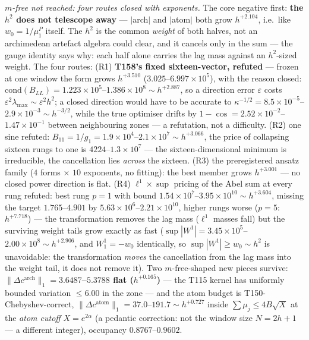 \documentclass[11pt,a4paper]{article}
\begin{document}
\emph{$m$-free not reached: four routes closed with exponents.} The core negative
first: \textbf{the $h^2$ does not telescope away} --- $|$arch$|$ and $|$atom$|$
both grow $h^{+2.104}$, i.e.\ like $w_0=1/\mu^P_1$ itself. The $h^2$ is the common
\emph{weight} of both halves, not an archimedean artefact algebra could clear, and
it cancels only in the sum --- the gauge identity says why: each half alone
carries the lag mass against an $h^2$-sized weight. The four routes: (R1)
\textbf{T158's fixed sixteen-vector, refuted} --- frozen at one window the form
grows $h^{+3.510}$ ($3.025$--$6.997\times10^{5}$), with the reason closed:
$\mathrm{cond}(B_{LL})=1.223\times10^{5}$--$1.386\times10^{8}\sim h^{+2.887}$, so
a direction error $\varepsilon$ costs $\varepsilon^2\lambda_{\max}\sim
\varepsilon^2h^2$; a closed direction would have to be accurate to
$\kappa^{-1/2}=8.5\times10^{-5}$--$2.9\times10^{-3}\sim h^{-3/2}$, while the true
optimiser drifts by $1-\cos=2.52\times10^{-2}$--$1.47\times10^{-1}$ between
neighbouring zones --- a refutation, not a difficulty. (R2) one sine refuted:
$B_{11}=1/g_1=1.9\times10^{4}$--$2.1\times10^{7}\sim h^{+3.066}$, the price of
collapsing sixteen rungs to one is $4224$--$1.3\times10^{7}$ --- the
sixteen-dimensional minimum is irreducible, the cancellation lies \emph{across}
the sixteen. (R3) the preregistered ansatz family ($4$ forms $\times$ $10$
exponents, no fitting): the best member grows $h^{+3.001}$ --- no closed power
direction is flat. (R4) $\ell^1\times\sup$ pricing of the Abel sum at every rung
refuted: best rung $p=1$ with bound $1.54\times10^{7}$--$3.95\times10^{10}\sim
h^{+3.604}$, missing the target $1.765$--$4.901$ by $5.63\times10^{6}$--$2.21
\times10^{10}$, higher rungs worse ($p=5$: $h^{+7.718}$) --- the transformation
removes the lag mass ($\ell^1$ masses fall) but the surviving weight tails grow
exactly as fast ($\sup|W^1|=3.45\times10^{5}$--$2.00\times10^{8}\sim h^{+2.906}$,
and $W^1_1=-w_0$ identically, so $\sup|W^1|\ge w_0\sim h^2$ is unavoidable: the
transformation \emph{moves} the cancellation from the lag mass into the weight
tail, it does not remove it). Two $m$-free-shaped new pieces survive:
\textbf{$\|\Delta c^{\mathrm{arch}}\|_1=3.6487$--$5.3788$ flat ($h^{+0.165}$)} ---
the T115 kernel has uniformly bounded variation $\le6.00$ in the zone --- and the
atom budget is T150-Chebyshev-correct, $\|\Delta c^{\mathrm{atom}}\|_1=37.0$--$191.7
\sim h^{+0.727}$ inside $\sum\mu_j\le4B\sqrt X$ at the \emph{atom cutoff}
$X=e^{2\alpha}$ (a pedantic correction: not the window size $N=2h+1$ --- a
different integer), occupancy $0.8767$--$0.9602$.
\end{document}
